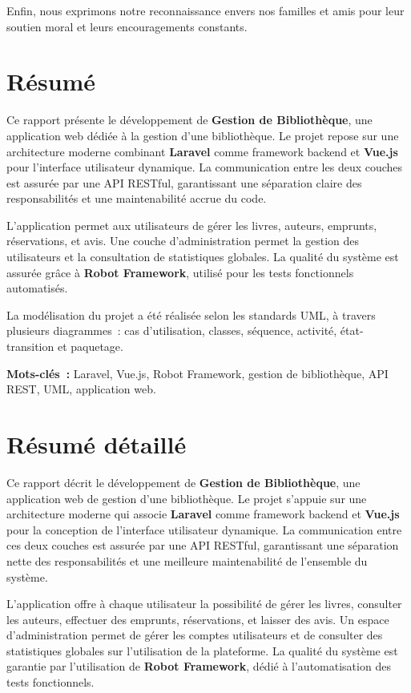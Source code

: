﻿\documentclass[12pt,a4paper]{report}
\begin{document}
Enfin, nous exprimons notre reconnaissance envers nos familles et amis pour leur
soutien moral et leurs encouragements constants.

\chapter*{Résumé}

Ce rapport pr\'esente le d\'eveloppement de \textbf{Gestion de Bibliothèque}, une application web
d\'edi\'ee \`a la gestion d'une biblioth\`eque. Le projet repose sur une architecture
moderne combinant \textbf{Laravel} comme framework backend et \textbf{Vue.js} pour
l'interface utilisateur dynamique. La communication entre les deux couches est assur\'ee
par une API RESTful, garantissant une s\'eparation claire des responsabilit\'es et une
maintenabilit\'e accrue du code.

L'application permet aux utilisateurs de g\'erer les livres, auteurs, emprunts, réservations,
et avis. Une couche d'administration permet la gestion des utilisateurs et la consultation
de statistiques globales. La qualit\'e du syst\`eme est assur\'ee gr\^ace \`a \textbf{Robot Framework},
utilis\'e pour les tests fonctionnels automatis\'es.

La mod\'elisation du projet a \'et\'e r\'ealis\'ee selon les standards UML, \`a
travers plusieurs diagrammes~: cas d'utilisation, classes, s\'equence, activit\'e,
\'etat-transition et paquetage.

\textbf{Mots-cl\'es~:} Laravel, Vue.js, Robot Framework, gestion de bibliothèque,
API REST, UML, application web.

\chapter*{Résumé détaillé}

Ce rapport d\'ecrit le d\'eveloppement de \textbf{Gestion de Bibliothèque}, une application web de
gestion d'une biblioth\`eque. Le projet s'appuie sur une architecture moderne qui
associe \textbf{Laravel} comme framework backend et \textbf{Vue.js} pour la conception
de l'interface utilisateur dynamique. La communication entre ces deux couches est
assur\'ee par une API RESTful, garantissant une s\'eparation nette des responsabilit\'es
et une meilleure maintenabilit\'e de l'ensemble du syst\`eme.

L'application offre \`a chaque utilisateur la possibilit\'e de gérer les livres, consulter les auteurs,
effectuer des emprunts, réservations, et laisser des avis. Un espace
d'administration permet de gérer les comptes utilisateurs et de consulter des
statistiques globales sur l'utilisation de la plateforme. La qualit\'e du syst\`eme
est garantie par l'utilisation de \textbf{Robot Framework}, dédié \`a
l'automatisation des tests fonctionnels.
\end{document}
